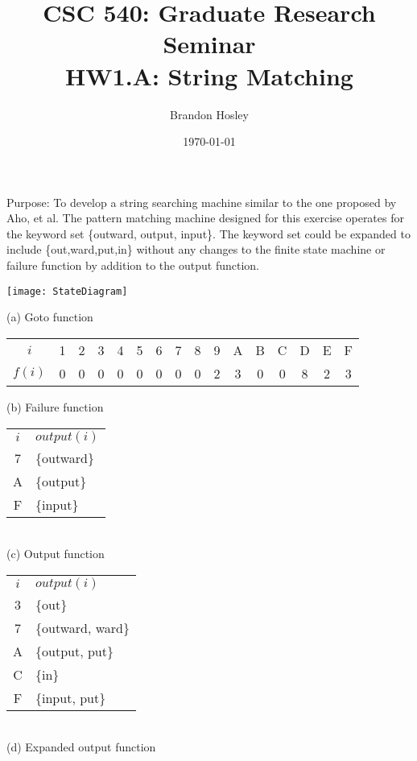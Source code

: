 \documentclass[]{article}
\title{
	CSC 540: Graduate Research Seminar \\ 
	HW1.A: String Matching}
\author{Brandon Hosley}
\date{\today}
\begin{document}
	\maketitle
	\clearpage
	
	Purpose: To develop a string searching machine similar to the one proposed by Aho, et al.\cite{Aho1975} The pattern matching machine designed for this exercise operates for the keyword set \{outward, output, input\}. The keyword set could be expanded to include \{out,ward,put,in\} without any changes to the finite state machine or failure function by addition to the output function.
	
	\vspace{1em}
	
	\texttt{[image: StateDiagram]} \\
	\begin{center}
		(a) Goto function
	\end{center}
	\vspace{1em}
	
	\begin{tabular}{c c c c c c c c c c c c c c c c}
		$i$		&1&2&3&4&5&6&7&8&9&A&B&C&D&E&F \\
		$f(i)$	&0&0&0&0&0&0&0&0&2&3&0&0&8&2&3 \\
	\end{tabular}
	\begin{center}
		(b) Failure function
	\end{center}
	\vspace{1em}

	\begin{center}
		\begin{tabular}{c l}
			$i$ & $output(i)$   \\
			\rule{0pt}{3ex}
			7 & \{outward\}\\
			A & \{output\} \\
			F & \{input\} \\
		\end{tabular} \\
		\vspace{0.5em}
		(c) Output function
	\end{center}
	\vspace{1em}
	
		\begin{center}
		\begin{tabular}{c l}
			$i$ & $output(i)$   \\
			\rule{0pt}{3ex}
			3 & \{out\} \\
			7 & \{outward, ward\}\\
			A & \{output, put\} \\
			C & \{in\} \\
			F & \{input, put\} \\
		\end{tabular} \\
		\vspace{0.5em}
		(d) Expanded output function
	\end{center}
	\vspace{1em}
	
	\clearpage
	
	
\end{document}
